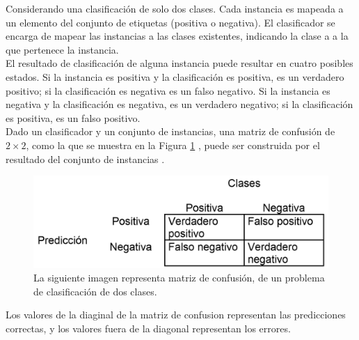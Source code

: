 Considerando una clasificación de solo dos clases. Cada instancia es mapeada a un elemento del conjunto de etiquetas (positiva o negativa). El clasificador se encarga de mapear las instancias a las clases existentes, indicando la clase a a la que pertenece la instancia.\\
El resultado de clasificación de alguna instancia puede resultar en cuatro posibles estados. Si la instancia es positiva y la clasificación es positiva, es un verdadero positivo; si la clasificación es negativa es un falso negativo. Si la instancia es negativa y la clasificación es negativa, es un verdadero negativo; si la clasificación es positiva, es un falso positivo. \\ 
Dado un clasificador y un conjunto de instancias, una matriz de confusión de $2 \times 2$, como la que se muestra en la Figura \ref{fig:Matrix} , puede ser construida por el resultado del conjunto de instancias \citep{Fawcett2006}.   
\begin{figure}[h!]
\begin{center}
\includegraphics[scale=.4]{./Figures/MatrixConfusion.png}
\end{center}
\caption{La siguiente imagen representa matriz de confusión, de un problema de clasificación de dos clases.}
\label{fig:Matrix}
\end{figure}
Los valores de la diaginal de la matriz de confusion representan las predicciones correctas, y los valores fuera de la diagonal representan los errores.

